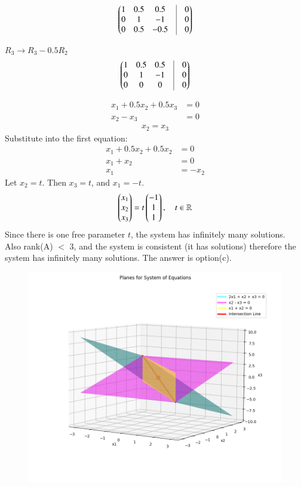 \documentclass[journal]{IEEEtran}
\begin{document}
   \begin{align}
    \myvec{
    1 & 0.5 & 0.5 & \vrule & 0 \\
    0 & 1 & -1 & \vrule & 0 \\
    0 & 0.5 & -0.5 & \vrule & 0
    }
    \end{align}

    $R_3 \rightarrow R_3 - 0.5 R_2$
    \begin{align}
    \myvec{
    1 & 0.5 & 0.5 & \vrule & 0 \\
    0 & 1 & -1 & \vrule & 0 \\
    0 & 0 & 0 & \vrule & 0
    }
    \end{align}

    \begin{align}
    x_1 + 0.5x_2 + 0.5x_3 &= 0 \\
    x_2 - x_3 &= 0
    \end{align}
    \begin{align}
    x_2 = x_3
    \end{align}
    Substitute into the first equation:
    \begin{align}
    x_1 + 0.5x_2 + 0.5x_2 &= 0 \\
    x_1 + x_2 &= 0 \\
    x_1 &= -x_2
    \end{align}
    Let $x_2 = t$. Then $x_3 = t$, and $x_1 = -t$.
    \begin{align}
    \begin{pmatrix}x_1 \\ x_2 \\ x_3\end{pmatrix} = t \begin{pmatrix}-1 \\ 1 \\ 1\end{pmatrix}, \quad t \in \mathbb{R}
    \end{align}
Since there is one free parameter $t$, the system has infinitely many solutions.\\
Also rank(A) $<$ 3, and the system is consistent (it has solutions) therefore the system has infinitely many solutions.
The answer is option(c).

\begin{figure}[H]
\centering
\includegraphics[width=0.7\columnwidth]{figs/fig1.png}
\caption{}
\label{fig:1}
\end{figure}
\end{document}
